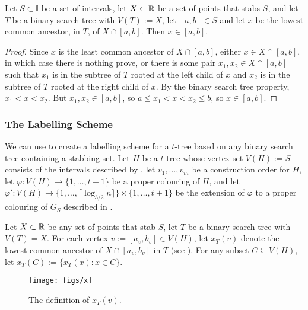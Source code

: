 \documentclass[kpfonts]{patmorin}
\begin{document}
\begin{lem}
  Let $S\subset\mathbb{I}$ be a set of intervals, let $X\subset\mathbb{R}$ be a set of points that stabs $S$, and let $T$ be a binary search tree with $V(T):=X$, let $[a,b]\in S$ and let $x$ be the lowest common ancestor, in $T$, of $X\cap [a,b]$.  Then $x\in [a,b]$.
\end{lem}

\begin{proof}
  Since $x$ is the least common ancestor of $X\cap[a,b]$, either $x\in X\cap[a,b]$, in which case there is nothing prove, or there is some pair $x_1,x_2\in X\cap[a,b]$ such that $x_1$ is in the subtree of $T$ rooted at the left child of $x$ and $x_2$ is in the subtree of $T$ rooted at the right child of $x$.  By the binary search tree property, $x_1<x<x_2$. But $x_1,x_2 \in [a,b]$, so $a\le x_1<x<x_2\le b$, so $x\in [a,b]$.  
\end{proof}

\subsubsection{The Labelling Scheme}

We can use  to create a labelling scheme for a $t$-tree based on any binary search tree containing a stabbing set.  Let $H$ be a $t$-tree whose vertex set $V(H):=S$ consists of the intervals described by , let $v_1,\ldots,v_m$ be a construction order for $H$, let $\varphi:V(H)\to\{1,\ldots,t+1\}$ be a proper colouring of $H$, and let $\varphi':V(H)\to\{1,\ldots,\lceil\log_{3/2} n\rceil\}\times\{1,\ldots,t+1\}$ be the extension of $\varphi$ to a proper colouring of $G_S$ described in .

Let $X\subset\mathbb{R}$ be any set of points that stab $S$, let $T$ be a binary search tree with $V(T)=X$.
For each vertex $v:=[a_v,b_v]\in V(H)$, let $x_T(v)$ denote the lowest-common-ancestor of $X\cap [a_v,b_v]$ in $T$ (see ).  For any subset $C\subseteq V(H)$, let $x_T(C):=\{x_T(x):x\in C\}$.  

\begin{figure}
  \begin{center}
    \texttt{[image: figs/x]}
  \end{center}
  \caption{The definition of $x_T(v)$.}
\end{figure}
\end{document}
